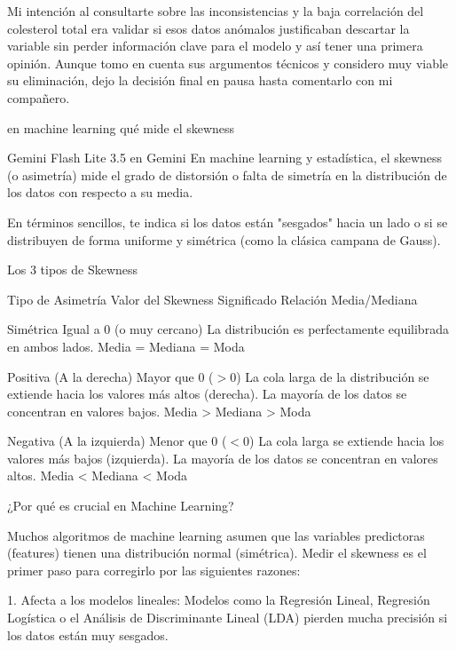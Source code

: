 \documentclass[12pt,a4paper,oneside]{book}
\begin{document}
\begin{iaanalisis}
Mi intención al consultarte sobre las inconsistencias y la baja correlación del colesterol total era validar si esos datos anómalos justificaban descartar la variable sin perder información clave para el modelo y así tener una primera opinión. Aunque tomo en cuenta sus argumentos técnicos y considero muy viable su eliminación, dejo la decisión final en pausa hasta comentarlo con mi compañero.
\end{iaanalisis}




\begin{iaprompt}
en machine learning qué mide el skewness
\end{iaprompt}
\begin{iaresp}{Gemini Flash Lite 3.5 en Gemini}
En machine learning y estadística, el skewness (o asimetría) mide el grado de distorsión o falta de simetría en la distribución de los datos con respecto a su media.

En términos sencillos, te indica si los datos están "sesgados" hacia un lado o si se distribuyen de forma uniforme y simétrica (como la clásica campana de Gauss).

Los 3 tipos de Skewness


Tipo de Asimetría	Valor del Skewness	Significado	Relación Media/Mediana

Simétrica	Igual a 0 (o muy cercano)	La distribución es perfectamente equilibrada en ambos lados.	Media = Mediana = Moda

Positiva (A la derecha)	Mayor que 0 (\(>0\))	La cola larga de la distribución se extiende hacia los valores más altos (derecha). La mayoría de los datos se concentran en valores bajos.	Media > Mediana > Moda

Negativa (A la izquierda)	Menor que 0 (\(<0\))	La cola larga se extiende hacia los valores más bajos (izquierda). La mayoría de los datos se concentran en valores altos.	Media < Mediana < Moda


¿Por qué es crucial en Machine Learning?

Muchos algoritmos de machine learning asumen que las variables predictoras (features) tienen una distribución normal (simétrica). Medir el skewness es el primer paso para corregirlo por las siguientes razones:

1. Afecta a los modelos lineales: Modelos como la Regresión Lineal, Regresión Logística o el Análisis de Discriminante Lineal (LDA) pierden mucha precisión si los datos están muy sesgados.


\end{iaresp}
\end{document}
